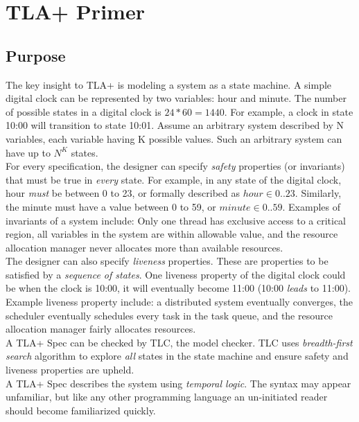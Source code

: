 \chapter{TLA+ Primer}

\section{Purpose}

The key insight to TLA+ is modeling a system as a state machine. A simple
digital clock can be represented by two variables: hour and minute. The
number of possible states in a digital clock is $24 * 60 = 1440$. For example, a
clock in state 10:00 will transition to state 10:01. Assume an arbitrary system
described by N variables, each variable having K possible values. Such an
arbitrary system can have up to $N^K$ states.\\

For every specification, the designer can specify \textit{safety} properties (or
invariants) that must be true in \textit{every} state. For example, in any
state of the digital clock, hour \textit{must} be between 0 to 23, or formally
described as $hour \in 0..23$. Similarly, the minute must have a value between 0 to
59, or $minute \in 0..59$. Examples of invariants of a system include: Only one
thread has exclusive access to a critical region, all variables in the system
are within allowable value, and the resource allocation manager never allocates more
than available resources.\\

The designer can also specify \textit{liveness} properties. These are properties to be
satisfied by a \textit{sequence of states}. One liveness property of the digital
clock could be when the clock is 10:00, it will eventually become 11:00 (10:00
\textit{leads} to 11:00). Example liveness property include: a distributed
system eventually converges, the scheduler eventually schedules every task in
the task queue, and the resource allocation manager fairly allocates resources.
\\

A TLA+ Spec can be checked by TLC, the model checker. TLC uses
\textit{breadth-first search} algorithm to explore \textit{all} states in the
state machine and ensure safety and liveness properties are upheld.\\

A TLA+ Spec describes the system using \textit{temporal logic}. The syntax may 
appear unfamiliar, but like any other programming 
language an un-initiated reader should become familiarized quickly.

